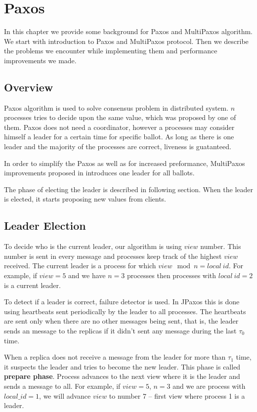 \chapter{Paxos}

In this chapter we provide some background for Paxos and MultiPaxos algorithm. We start with introduction to Paxos and MultiPaxos protocol. Then we describe the problems we encounter while implementing them and performance improvements we made.

\section{Overview}
Paxos algorithm is used to solve consensus problem in distributed system. $n$ processes tries to decide upon the same value, which was proposed by one of them. Paxos does not need a coordinator, however a processes may consider himself a leader for a certain time for specific ballot. As long as there is one leader and the majority of the processes are correct, liveness is guatanteed.

In order to simplify the Paxos as well as for increased preformance, MultiPaxos improvements proposed in \cite{Lam01} introduces one leader for all ballots.

The phase of electing the leader is described in following section. When the leader is elected, it starts proposing new values from clients.

\section{Leader Election}
\label{sec:leader_election}
\indent\par

To decide who is the current leader, our algorithm is using $view$ number. This number is sent in every message and processes keep track of the highest $view$ received. The current leader is a process for which $view \mod n = local~id$. For example, if $view = 5$ and we have $n = 3$ processes then processes with $local~id = 2$ is a current leader.

To detect if a leader is correct, failure detector is used. In JPaxos this is done using heartbeats sent periodically by the leader to all processes. The heartbeats are sent only when there are no other messages being sent, that is, the leader sends an \alive message to the replicas if it didn't sent any message during the last $\tau_0$ time.

When a replica does not receive a message from the leader for more than $\tau_1$ time, it suspects the leader and tries to become the new leader. This phase is called \textbf{prepare phase}. Process advances to the next view where it is the leader and sends a \prepare message to all. For example, if $view = 5$, $n = 3$ and we are process with $local\_id = 1$, we will advance $view$ to number 7 -- first view where process 1 is a leader.

